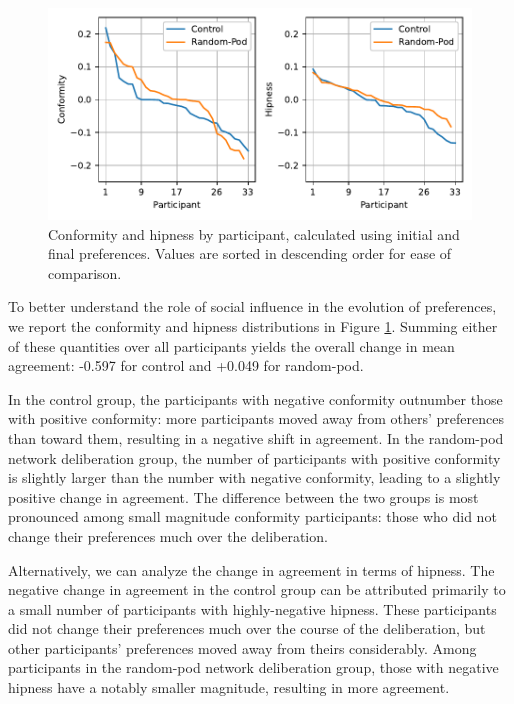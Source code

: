 {\begin{figure}
    \centering
    \includegraphics[width=6in]{chapters/figures/NetDelibExp/fig-hipness-conformity.pdf}
    \caption{Conformity and hipness by participant, calculated using initial and final preferences. Values are sorted in descending order for ease of comparison.}
    \label{fig:conformity}
\end{figure}

To better understand the role of social influence in the evolution of preferences, we report the conformity and hipness distributions in Figure \ref{fig:conformity}.
Summing either of these quantities over all participants yields the overall change in mean agreement: -0.597 for control and +0.049 for random-pod.

In the control group, the participants with negative conformity outnumber those with positive conformity:
more participants moved away from others' preferences than toward them, resulting in a negative shift in agreement.
In the random-pod network deliberation group, the number of participants with positive conformity is slightly larger than the number with negative conformity, leading to a slightly positive change in agreement.
The difference between the two groups is most pronounced among small magnitude conformity participants: those who did not change their preferences much over the deliberation.

Alternatively, we can analyze the change in agreement in terms of hipness. The negative change in agreement in the control group can be attributed primarily to a small number of participants with highly-negative hipness.
These participants did not change their preferences much over the course
of the deliberation,
but other participants' preferences moved away from theirs considerably.
Among participants in the random-pod network deliberation group,
those with negative hipness have a notably smaller magnitude,
resulting in more agreement.

}
